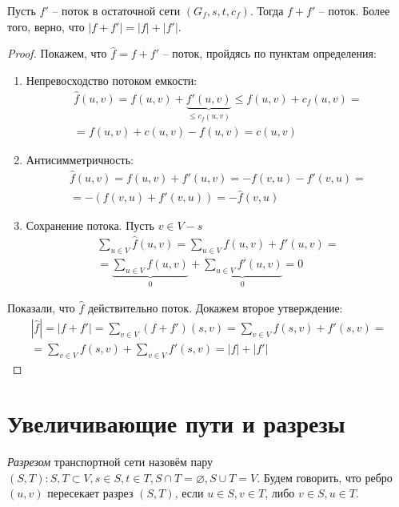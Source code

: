  Пусть $f'$ -- поток в остаточной сети $(G_f, s, t, c_f)$. Тогда $f + f'$ -- поток. 
Более того, верно, что $|f + f'| = |f| + |f'|$.
\begin{proof}

    Покажем, что $\hat f = f + f'$ -- поток, пройдясь по пунктам определения:
    \begin{enumerate}
        \item Непревосходство потоком емкости:
            \begin{multline*}
                \hat f(u, v) = f(u, v) + \underbrace{f'(u, v)}_{\leq c_f(u, v)} \leq f(u, v) + c_f(u, v) = \\ = f(u, v) + c(u, v) - f(u, v) = c(u, v)
            \end{multline*}
        \item Антисимметричность:
            \begin{multline*}
                \hat f(u, v) = f(u, v) + f'(u, v) = -f(v, u) - f'(v, u) = \\ = - (f(v, u) + f'(v, u)) = - \hat f(v, u)
            \end{multline*}
        \item Сохранение потока. Пусть $v \in V - s$
            \begin{multline*}
                \sum\limits_{u \in V} \hat f(u, v) = \sum\limits_{u \in V} f(u, v) + f'(u, v) = \\
                = \underbrace{\sum\limits_{u \in V} f(u, v)}_{0} + \underbrace{\sum\limits_{u \in V} f'(u, v)}_{0} = 0
            \end{multline*}
    \end{enumerate}
    
    Показали, что $\hat f$ действительно поток. Докажем второе утверждение:
    \begin{multline*}
        |\hat f| = |f + f'| = \sum\limits_{v \in V} (f + f') (s, v) = \sum\limits_{v \in V} f(s, v) + f'(s, v) = \\
        = \sum\limits_{v \in V} f(s, v) + \sum\limits_{v \in V} f'(s, v) = |f| + |f'|
    \end{multline*}
\end{proof}

\section{Увеличивающие пути и разрезы}

\Def \textit{Разрезом} транспортной сети назовём пару $(S, T): S, T \subset V, s \in S, t \in T, S \cap T = \varnothing, S \cup T = V$.
Будем говорить, что ребро $(u, v)$ пересекает разрез $(S, T)$, если $u \in S, v \in T$, либо $v \in S, u \in T$.

